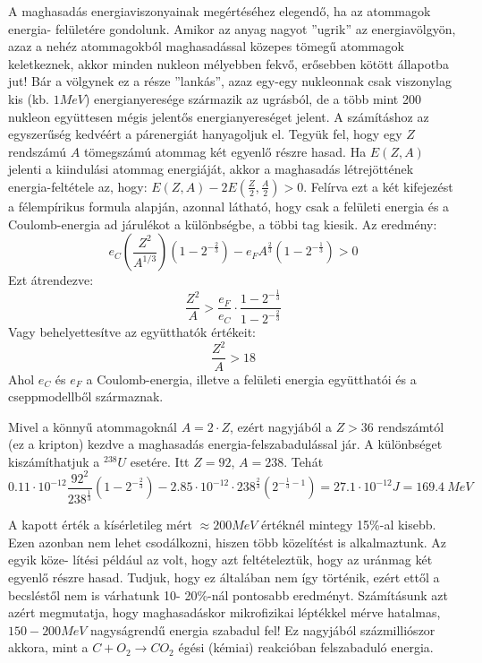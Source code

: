 \documentclass[../main.tex]{subfiles}
\begin{document}
A maghasadás energiaviszonyainak megértéséhez elegendő, ha az atommagok energia-
felületére gondolunk. Amikor az anyag nagyot ”ugrik” az energiavölgyön, azaz a nehéz atommagokból maghasadással közepes tömegű atommagok keletkeznek,
akkor minden nukleon mélyebben fekvő, erősebben kötött állapotba jut! Bár a
völgynek ez a része ”lankás”, azaz egy-egy nukleonnak csak viszonylag kis (kb. $1 MeV$)
energianyeresége származik az ugrásból, de a több mint 200 nukleon együttesen mégis
jelentős energianyereséget jelent. A számításhoz az egyszerűség kedvéért a párenergiát
hanyagoljuk el.
Tegyük fel, hogy egy $Z$ rendszámú $A$ tömegszámú atommag két egyenlő részre hasad.
Ha $E(Z, A)$ jelenti a kiindulási atommag energiáját, akkor a maghasadás létrejöttének
energia-feltétele az, hogy: $E(Z, A) - 2E\left(\frac{Z}{2}, \frac{A}{2}\right) > 0$. Felírva ezt a két kifejezést a félempírikus formula alapján, azonnal látható, hogy csak a felületi energia és a Coulomb-energia ad járulékot
a különbségbe, a többi tag kiesik. Az eredmény:
\begin{equation}
    e_C \left(\frac{Z^2}{A^{1/3}}\right)\left(1-2^{-\frac{2}{3}}\right) - e_F A^{\frac{2}{3}} \left(1-2^{-\frac{1}{3}}\right) > 0
\end{equation}
Ezt átrendezve:
\begin{equation}
    \frac{Z^2}{A} > \frac{e_F}{e_C} \cdot \frac{1 - 2^{-\frac{1}{3}}}{1 - 2^{-\frac{2}{3}}}
\end{equation}
Vagy behelyettesítve az együtthatók értékeit:
\begin{equation}
    \frac{Z^2}{A} > 18
\end{equation}
Ahol $e_C$ és $e_F$ a Coulomb-energia, illetve a felületi energia együtthatói és a cseppmodellből származnak.

Mivel a könnyű atommagoknál $A = 2 \cdot Z$, ezért nagyjából a $Z > 36$ rendszámtól (ez a kripton) kezdve a maghasadás energia-felszabadulással jár.
A különbséget kiszámíthatjuk a $^{238}U$ esetére. Itt $Z = 92$, $A = 238$. Tehát
\begin{equation}
    0.11 \cdot 10^{-12} \frac{92^{2}}{238^{\frac{1}{3}}} \left(1 - 2^{-\frac{2}{3}}\right) - 2.85 \cdot 10^{-12} \cdot 238^{\frac{2}{3}} \left(2^{-\frac{1}{3} - 1}\right) = 27.1 \cdot 10^{-12} J = 169.4 \ MeV
\end{equation}

A kapott érték a kísérletileg mért $\approx 200 MeV$ értéknél mintegy 15\%-al kisebb. Ezen
azonban nem lehet csodálkozni, hiszen több közelítést is alkalmaztunk. Az egyik köze-
lítési például az volt, hogy azt feltételeztük, hogy az uránmag két egyenlő részre hasad.
Tudjuk, hogy ez általában nem így történik, ezért ettől a becsléstől nem is várhatunk 10-
20\%-nál pontosabb eredményt. Számításunk azt azért megmutatja, hogy maghasadáskor
mikrofizikai léptékkel mérve hatalmas, $150-200 MeV$ nagyságrendű energia szabadul fel!
Ez nagyjából százmilliószor akkora, mint a $C+O_2 \rightarrow CO_2$ égési (kémiai) reakcióban felszabaduló energia.
\end{document}
